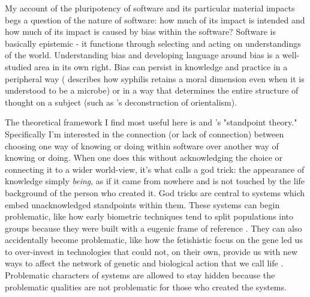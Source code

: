 \documentclass[a4paper,man,natbib,floatsintext]{apa6}
\begin{document}
   My account of the pluripotency of software and its particular material impacts begs a question of the nature of software: how much of its impact is intended and how much of its impact is caused by bias within the software? Software is basically epistemic - it functions through selecting and acting on understandings of the world. Understanding bias and developing language around bias is a well-studied area in its own right. Bias can persist in knowledge and practice in a peripheral way (\citet{Fleck2012-qr} describes how syphilis retains a moral dimension even when it is understood to be a microbe) or in a way that determines the entire structure of thought on a subject (such as \citet{Said1979-jw}'s deconstruction of orientalism). 

   The theoretical framework I find most useful here is \citet{Harding1992-od} and \citet{Haraway1988-nh}'s "standpoint theory." Specifically I'm interested in the connection (or lack of connection) between choosing one way of knowing or doing within software over another way of knowing or doing. When one does this without acknowledging the choice or connecting it to a wider world-view, it's what \citet{Haraway1988-nh} calls a god trick: the appearance of knowledge simply \textit{being}, as if it came from nowhere and is not touched by the life background of the person who created it. God tricks are central to systems which embed unacknowledged standpoints within them. These systems can begin problematic, like how early biometric techniques tend to split populations into groups because they were built with a eugenic frame of reference \citet{Subramaniam2014-wg}. They can also accidentally become problematic, like how the fetishistic focus on the gene led us to over-invest in technologies that could not, on their own, provide us with new ways to affect the network of genetic and biological action that we call life \citet{Harraway1997-va,Reardon2017-bo}. Problematic characters of systems are allowed to stay hidden because the problematic qualities are not problematic for those who created the systems. 
\end{document}
